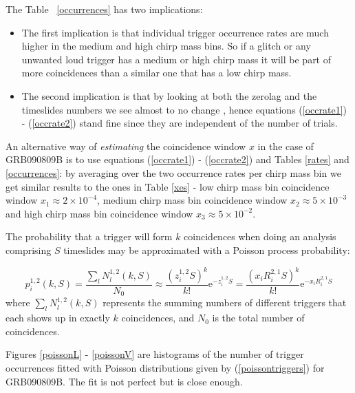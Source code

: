 \documentclass[epsf]{article}
\begin{document}
The Table ~\ref{occurrences} has two implications:
\begin{itemize}
\item
The first implication is that individual trigger occurrence rates are much higher in the medium and high chirp mass bins. So if a glitch or any unwanted loud trigger has a medium or high chirp mass it will be part of more coincidences than a similar one that has a low chirp mass.
\item
The second implication is that by looking at both the zerolag and the timeslides numbers we see almost to no change , hence equations (\ref{occrate1}) - (\ref{occrate2}) stand fine since they are independent of the number of trials.
\end{itemize}

An alternative way of \emph{estimating} the coincidence window $x$ in the case of GRB090809B is to use equations (\ref{occrate1}) - (\ref{occrate2}) and Tables \ref{rates} and \ref{occurrences}: by averaging over the two occurrence rates per chirp mass bin we get similar results to  the ones in Table \ref{xes} - low chirp mass bin coincidence window $x_1 \approx 2 \times 10^{-4}$, medium chirp mass bin coincidence window $x_2 \approx 5 \times 10^{-3}$ and high chirp mass bin coincidence window $x_3 \approx 5 \times 10^{-2}$.

The probability that a trigger will form $k$ coincidences when doing an analysis comprising $S$ timeslides may be approximated with a Poisson process probability:

\begin{equation}
\label{poissontriggers}
p^{1,2}_i(k, S) = \frac{\sum_l N^{1,2}_l(k, S)}{N_0} \approx \frac{{(z^{1,2}_iS)}^k}{k!} \mathrm{e}^{-z^{1,2}_iS} = \frac{{(x_iR^{2,1}_iS)}^k}{k!} \mathrm{e}^{-x_iR^{2,1}_iS}
\end{equation} 
%
where $\sum_l N^{1,2}_l(k, S)$ represents the summing numbers of different triggers that each shows up in exactly $k$ coincidences, and $N_0$ is the total number of coincidences.

Figures \ref{poissonL} - \ref{poissonV} are histograms of the number of trigger occurrences fitted with Poisson distributions given by (\ref{poissontriggers}) for GRB090809B. The fit is not perfect but is close enough. 
\end{document}
